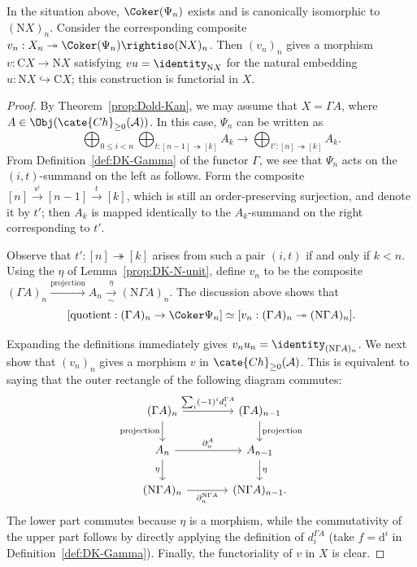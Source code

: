 \begin{proposition}\label{prop:Dold-Kan-v}
	In the situation above, $\Coker(\Psi_n)$ exists and is canonically
	isomorphic to $(\mathrm{N}X)_n$. Consider the corresponding composite
	$v_n:X_n\twoheadrightarrow\Coker(\Psi_n)\rightiso(\mathrm{N}X)_n$.
	Then $(v_n)_n$ gives a morphism
	$v:\mathrm{C}X\to\mathrm{N}X$ satisfying
	$vu=\identity_{\mathrm{N}X}$ for the natural embedding
	$u:\mathrm{N}X\hookrightarrow\mathrm{C}X$; this construction is
	functorial in $X$.
\end{proposition}
\begin{proof}
	By Theorem~\ref{prop:Dold-Kan}, we may assume that $X=\Gamma A$, where
	$A\in\Obj(\cate{Ch}_{\geq0}(\mathcal{A}))$. In this case, $\Psi_n$ can
	be written as
	\[ \bigoplus_{0 \leq i < n} \bigoplus_{t: [n-1] \twoheadrightarrow [k]} A_k \to \bigoplus_{t': [n] \twoheadrightarrow [k] } A_k. \]
	From Definition~\ref{def:DK-Gamma} of the functor $\Gamma$, we see that
	$\Psi_n$ acts on the $(i,t)$-summand on the left as follows. Form the
	composite $[n]\xrightarrow{\mathrm{s}^i}[n-1]\xrightarrow{t}[k]$, which
	is still an order-preserving surjection, and denote it by $t'$; then $A_k$
	is mapped identically to the $A_k$-summand on the right corresponding to
	$t'$.

	Observe that $t':[n]\twoheadrightarrow[k]$ arises from such a pair $(i,t)$
	if and only if $k<n$. Using the $\eta$ of
	Lemma~\ref{prop:DK-N-unit}, define $v_n$ to be the composite
	$(\Gamma A)_n\xrightarrow{\text{projection}}A_n
	\xrightarrow[\sim]{\eta}(\mathrm{N}\Gamma A)_n$. The discussion above
	shows that
	\[ [\text{quotient}: (\Gamma A)_n \to \Coker \Psi_n] \simeq [v_n: (\Gamma A)_n \twoheadrightarrow (\mathrm{N}\Gamma A)_n ] . \]

	Expanding the definitions immediately gives
	$v_nu_n=\identity_{(\mathrm{N}\Gamma A)_n}$. We next show that $(v_n)_n$
	gives a morphism $v$ in $\cate{Ch}_{\geq0}(\mathcal{A})$. This is
	equivalent to saying that the outer rectangle of the following diagram
	commutes:
	\[\begin{tikzcd}[column sep=large]
		(\Gamma A)_n \arrow[r, "{\sum_i (-1)^i d^{\Gamma A}_i}"] \arrow[d, "\text{projection}"'] & (\Gamma A)_{n-1} \arrow[d, "\text{projection}"] \\
		A_n \arrow[r, "{\partial^A_n}"] \arrow[d, "\eta"'] & A_{n-1} \arrow[d, "\eta"] \\
		(\mathrm{N}\Gamma A)_n \arrow[r, "{\partial^{\mathrm{N}\Gamma A}_n}"'] & (\mathrm{N}\Gamma A)_{n-1}.
	\end{tikzcd}\]
	The lower part commutes because $\eta$ is a morphism, while the
	commutativity of the upper part follows by directly applying the definition
	of $d_i^{\Gamma A}$ (take $f=\mathrm{d}^i$ in
	Definition~\ref{def:DK-Gamma}). Finally, the functoriality of $v$ in $X$
	is clear.
\end{proof}

